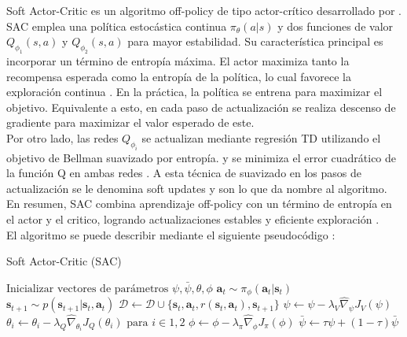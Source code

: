 Soft Actor-Critic es un algoritmo off-policy de tipo actor-crítico desarrollado por \textcite{haarnoja2018sac}. SAC emplea una política estocástica continua $\pi_\theta(a|s)$ y dos funciones de valor $Q_{\phi_1}(s,a)$ y $Q_{\phi_2}(s,a)$ para mayor estabilidad. Su característica principal es incorporar un término de entropía máxima. El actor maximiza tanto la recompensa esperada como la entropía de la política, lo cual favorece la exploración continua \parencite{haarnoja2018sac}. En la práctica, la política se entrena para maximizar el objetivo. Equivalente a esto, en cada paso de actualización se realiza descenso de gradiente para maximizar el valor esperado de este. \\

Por otro lado, las redes $Q_{\phi_i}$ se actualizan mediante regresión TD utilizando el objetivo de Bellman suavizado por entropía. y se minimiza el error cuadrático de la función Q en ambas redes \parencite{haarnoja2018sac}. A esta técnica de suavizado en los pasos de actualización se le denomina soft updates y son lo que da nombre al algoritmo. En resumen, SAC combina aprendizaje off-policy con un término de entropía en el actor y el critico, logrando actualizaciones estables y eficiente exploración \parencite{haarnoja2018sac}. \\

El algoritmo se puede describir mediante el siguiente pseudocódigo \parencite{haarnoja2018sac}:

\begin{algorithm}
	\caption{Soft Actor-Critic (SAC)}\label{alg:sac}
	\begin{algorithmic}[1]
		\State $\text{Inicializar vectores de parámetros } \psi, \bar{\psi}, \theta, \phi$
		\State $\mathbf{a}_t \sim \pi_\phi (\mathbf{a}_t|\mathbf{s}_t)$
		\State $\mathbf{s}_{t+1} \sim p(\mathbf{s}_{t+1}|\mathbf{s}_t,\mathbf{a}_t)$
		\State $\mathcal{D} \leftarrow \mathcal{D} \cup \{\mathbf{s}_t,\mathbf{a}_t,r(\mathbf{s}_t,\mathbf{a}_t),\mathbf{s}_{t+1}\}$
		\EndFor
		\State $\psi \leftarrow \psi - \lambda_V \hat{\nabla}_\psi J_V(\psi)$
		\State $\theta_i \leftarrow \theta_i - \lambda_Q \hat{\nabla}_{\theta_i} J_Q(\theta_i) \text{ para } i\in{1,2}$
		\State $\phi \leftarrow \phi - \lambda_\pi \hat{\nabla}_\phi J_\pi(\phi)$
		\State $\bar{\psi} \leftarrow \tau\psi + (1-\tau)\bar{\psi}$
		\EndFor
		\EndFor
	\end{algorithmic}
\end{algorithm}


